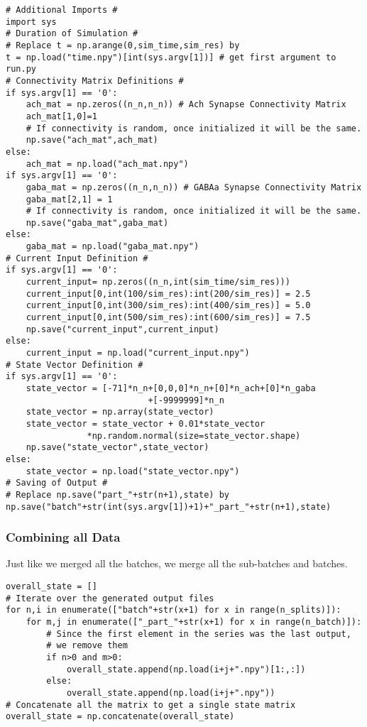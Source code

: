 \documentclass[10pt,letterpaper]{article}
\begin{document}
\begin{verbatim}
# Additional Imports #
import sys
# Duration of Simulation #
# Replace t = np.arange(0,sim_time,sim_res) by
t = np.load("time.npy")[int(sys.argv[1])] # get first argument to run.py
# Connectivity Matrix Definitions #
if sys.argv[1] == '0':
    ach_mat = np.zeros((n_n,n_n)) # Ach Synapse Connectivity Matrix
    ach_mat[1,0]=1
    # If connectivity is random, once initialized it will be the same.
    np.save("ach_mat",ach_mat)
else:
    ach_mat = np.load("ach_mat.npy")
if sys.argv[1] == '0':
    gaba_mat = np.zeros((n_n,n_n)) # GABAa Synapse Connectivity Matrix
    gaba_mat[2,1] = 1
    # If connectivity is random, once initialized it will be the same.
    np.save("gaba_mat",gaba_mat)
else:
    gaba_mat = np.load("gaba_mat.npy")
# Current Input Definition #
if sys.argv[1] == '0':
    current_input= np.zeros((n_n,int(sim_time/sim_res)))
    current_input[0,int(100/sim_res):int(200/sim_res)] = 2.5
    current_input[0,int(300/sim_res):int(400/sim_res)] = 5.0
    current_input[0,int(500/sim_res):int(600/sim_res)] = 7.5
    np.save("current_input",current_input)
else:
    current_input = np.load("current_input.npy")
# State Vector Definition #
if sys.argv[1] == '0':
    state_vector = [-71]*n_n+[0,0,0]*n_n+[0]*n_ach+[0]*n_gaba
    						+[-9999999]*n_n
    state_vector = np.array(state_vector)
    state_vector = state_vector + 0.01*state_vector
    			*np.random.normal(size=state_vector.shape)
    np.save("state_vector",state_vector)
else:
    state_vector = np.load("state_vector.npy")
# Saving of Output #
# Replace np.save("part_"+str(n+1),state) by
np.save("batch"+str(int(sys.argv[1])+1)+"_part_"+str(n+1),state)
\end{verbatim}

\subsubsection*{Combining all Data}
Just like we merged all the batches, we merge all the sub-batches and batches.

\begin{verbatim}
overall_state = []
# Iterate over the generated output files
for n,i in enumerate(["batch"+str(x+1) for x in range(n_splits)]):
    for m,j in enumerate(["_part_"+str(x+1) for x in range(n_batch)]):
        # Since the first element in the series was the last output, 
        # we remove them
        if n>0 and m>0:
            overall_state.append(np.load(i+j+".npy")[1:,:])
        else:
            overall_state.append(np.load(i+j+".npy"))
# Concatenate all the matrix to get a single state matrix
overall_state = np.concatenate(overall_state)
\end{verbatim}
\end{document}
